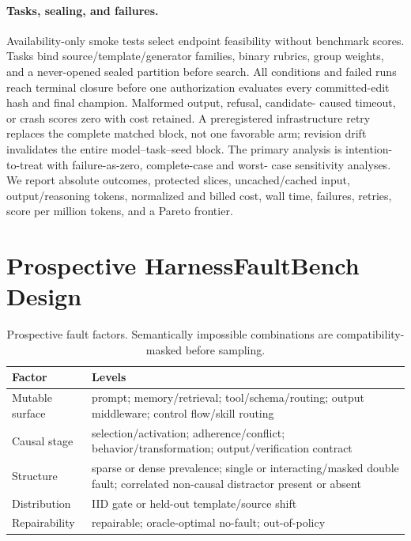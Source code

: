 \paragraph{Tasks, sealing, and failures.}
Availability-only smoke tests select endpoint feasibility without benchmark
scores.  Tasks bind source/template/generator families, binary rubrics, group
weights, and a never-opened sealed partition before search.  All conditions and
failed runs reach terminal closure before one authorization evaluates every
committed-edit hash and final champion.  Malformed output, refusal, candidate-
caused timeout, or crash scores zero with cost retained.  A preregistered
infrastructure retry replaces the complete matched block, not one favorable
arm; revision drift invalidates the entire model--task--seed block.  The primary
analysis is intention-to-treat with failure-as-zero, complete-case and worst-
case sensitivity analyses.  We report absolute outcomes, protected slices,
uncached/cached input, output/reasoning tokens, normalized and billed cost, wall
time, failures, retries, score per million tokens, and a Pareto frontier.

\section{Prospective HarnessFaultBench Design}
\label{app:fault-design}

\begin{table}[h]
  \caption{Prospective fault factors.  Semantically impossible combinations are
  compatibility-masked before sampling.}
  \label{tab:fault-factors}
  \centering
  \begin{tabular}{p{1.25in}p{3.80in}}
    \toprule
    \textbf{Factor} & \textbf{Levels} \\
    \midrule
    Mutable surface & prompt; memory/retrieval; tool/schema/routing;
      output middleware; control flow/skill routing \\
    Causal stage & selection/activation; adherence/conflict;
      behavior/transformation; output/verification contract \\
    Structure & sparse or dense prevalence; single or interacting/masked
      double fault; correlated non-causal distractor present or absent \\
    Distribution & IID gate or held-out template/source shift \\
    Repairability & repairable; oracle-optimal no-fault; out-of-policy \\
    \bottomrule
  \end{tabular}
\end{table}

